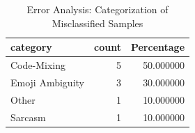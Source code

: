 \begin{table}[h!]
\centering
\caption{Error Analysis: Categorization of Misclassified Samples}
\label{tab:error_analysis}
\begin{tabular}{lrr}
\toprule
category & count & Percentage \\
\midrule
Code-Mixing & 5 & 50.000000 \\
Emoji Ambiguity & 3 & 30.000000 \\
Other & 1 & 10.000000 \\
Sarcasm & 1 & 10.000000 \\
\bottomrule
\end{tabular}

\end{table}